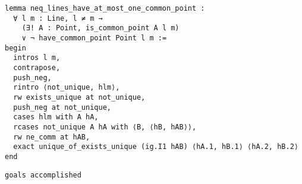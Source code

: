 \begin{frame}[fragile]
	\begin{multicols}{2}
		\begin{lstlisting}
lemma neq_lines_have_at_most_one_common_point :
  ∀ l m : Line, l ≠ m → 
    (∃! A : Point, is_common_point A l m) 
    ∨ ¬ have_common_point Point l m := 
begin
  intros l m,
  contrapose,
  push_neg,
  rintro ⟨not_unique, hlm⟩,
  rw exists_unique at not_unique,
  push_neg at not_unique,
  cases hlm with A hA,
  rcases not_unique A hA with ⟨B, ⟨hB, hAB⟩⟩,
  rw ne_comm at hAB,
  exact unique_of_exists_unique (ig.I1 hAB) ⟨hA.1, hB.1⟩ ⟨hA.2, hB.2⟩
end
\end{lstlisting}
		\columnbreak
		\lstinline{goals accomplished} \checkmark
	\end{multicols}
\end{frame}





























